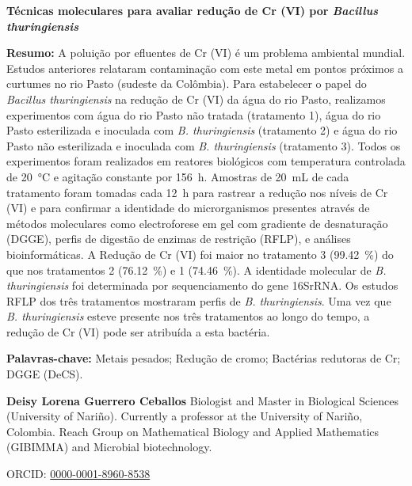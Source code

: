 \documentclass{univsciauth}
\begin{document}
\begin{shaded*}
        {\fontsize{11}{10}\selectfont\textbf{\textcolor{myseccolor}{Técnicas moleculares para avaliar
        redução de Cr (VI) por \emph{Bacillus thuringiensis}}}}

        \vspace{3mm}

        {\fontsize{11}{10}\selectfont\textbf{\textcolor{myseccolor}{Resumo:}}}
        A poluição por efluentes de Cr (VI) é um problema ambiental mundial. Estudos anteriores relataram
        contaminação com este metal em pontos próximos a curtumes no rio Pasto (sudeste da Colômbia). Para
        estabelecer o papel do \emph{Bacillus thuringiensis} na redução de Cr (VI) da água do rio Pasto, realizamos experimentos
        com água do rio Pasto não tratada (tratamento 1), água do rio Pasto esterilizada e inoculada com \emph{B. thuringiensis}
        (tratamento 2) e água do rio Pasto não esterilizada e inoculada com \emph{B. thuringiensis} (tratamento 3). Todos os
        experimentos foram realizados em reatores biológicos com temperatura controlada de \SI{20}{\celsius} e agitação
        constante por \SI{156}{h}. Amostras de \SI{20}{mL} de cada tratamento foram tomadas cada \SI{12}{h} para rastrear a redução
        nos níveis de Cr (VI) e para confirmar a identidade do microrganismos presentes através de métodos
        moleculares como electroforese em gel com gradiente de desnaturação (DGGE), perfis de digestão de
        enzimas de restrição (RFLP), e análises bioinformáticas. A Redução de Cr (VI) foi maior no tratamento 3
        (\SI{99.42}{\%}) do que nos tratamentos 2 (\SI{76.12}{\%}) e 1 (\SI{74.46}{\%}). A identidade molecular de \emph{B. thuringiensis} foi
        determinada por sequenciamento do gene 16SrRNA. Os estudos RFLP dos três tratamentos mostraram perfis
        de \emph{B. thuringiensis}. Uma vez que \emph{B. thuringiensis} esteve presente nos três tratamentos ao longo do tempo, a
        redução de Cr (VI) pode ser atribuída a esta bactéria.

        {\fontsize{11}{10}\selectfont\textbf{\textcolor{myseccolor}{Palavras-chave:}}} 
        Metais pesados; Redução de cromo; Bactérias redutoras de Cr; DGGE (DeCS).
\end{shaded*}
\clearpage
\begin{shaded*}
        {\fontsize{11}{10}\selectfont\textbf{\textcolor{myseccolor}{Deisy Lorena Guerrero Ceballos}}}
        Biologist and Master in Biological Sciences (University of Nariño). Currently a professor at the
        University of Nariño, Colombia. Reach Group on Mathematical Biology and Applied Mathematics
        (GIBIMMA) and Microbial biotechnology.

        ORCID: \href{https://orcid.org/0000-0001-8960-8538}{0000-0001-8960-8538}
\end{shaded*}
\end{document}
